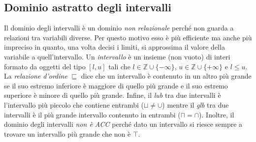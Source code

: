 \documentclass[a4paper,oneside,titlepage]{book}
\begin{document}
\subsection{Dominio astratto degli intervalli}
Il dominio degli intervalli è un dominio \textit{non relazionale} perché non guarda a relazioni tra variabili diverse. Per questo motivo esso è più efficiente ma anche più impreciso in quanto, una volta decisi i limiti, si approssima il valore della variabile a quell'intervallo. Un \textit{intervallo} è un insieme (non vuoto) di interi formato da oggetti del tipo $[l,u]$ tali che $l \in \mathbb{Z} \cup \{ - \infty \}$, $u \in \mathbb{Z} \cup \{ + \infty \}$ e $l \leq u$. La \textit{relazione d'ordine} $\sqsubseteq$ dice che un intervallo è contenuto in un altro più grande se il suo estremo inferiore è maggiore di quello più grande e il suo estremo superiore è minore di quello più grande. Infine, il \textit{lub} tra due intervalli è l'intervallo più piccolo che contiene entrambi ($\sqcup \neq \cup$) mentre il \textit{glb} tra due intervalli è il più grande intervallo contenuto in entrambi ($\sqcap = \cap$). Inoltre, il dominio degli intervalli \textit{non è ACC} perché dato un intervallo si riesce sempre a trovare un intervallo più grande che non è $\top$.
\end{document}
